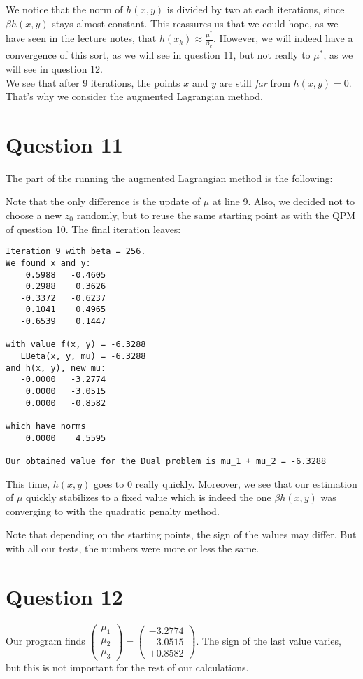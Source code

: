 \documentclass{article}
\begin{document}
We notice that the norm of $h(x, y)$ is divided by two at each iterations, since $\beta h(x, y)$ stays almost constant.
This reassures us that we could hope, as we have seen in the lecture notes, that $h(x_k) \approx \frac{\mu^*}{\beta_k}$. However, we will indeed have a convergence of this sort, as we will see in question 11, but not really to $\mu^*$, as we will see in question 12.\\
We see that after 9 iterations, the points $x$ and $y$ are still \textit{far} from $h(x, y) = 0$. That's why we consider the augmented Lagrangian method.


\section*{Question 11}
The part of the  running the augmented Lagrangian method is the following:


Note that the only difference is the update of $\mu$ at line 9. Also, we decided not to choose a new $z_0$ randomly, but to reuse the same starting point as with the QPM of question 10.
The final iteration leaves:
\begin{lstlisting}
Iteration 9 with beta = 256.
We found x and y:
    0.5988   -0.4605
    0.2988    0.3626
   -0.3372   -0.6237
    0.1041    0.4965
   -0.6539    0.1447

with value f(x, y) = -6.3288
   LBeta(x, y, mu) = -6.3288
and h(x, y), new mu:
   -0.0000   -3.2774
    0.0000   -3.0515
    0.0000   -0.8582

which have norms
    0.0000    4.5595

Our obtained value for the Dual problem is mu_1 + mu_2 = -6.3288
\end{lstlisting}

This time, $h(x, y)$ goes to 0 really quickly. Moreover, we see that our estimation of $\mu$ quickly stabilizes to a fixed value which is indeed the one $\beta h(x, y)$ was converging to with the quadratic penalty method.

Note that depending on the starting points, the sign of the values may differ. But with all our tests, the numbers were more or less the same.


\section*{Question 12}

Our program finds  
$\begin{pmatrix}
\mu_1\\
\mu_2\\
\mu_3
\end{pmatrix} =
\begin{pmatrix}
-3.2774\\
-3.0515\\
\pm 0.8582
\end{pmatrix}$. The sign of the last value varies, but this is not important for the rest of our calculations.
\end{document}
